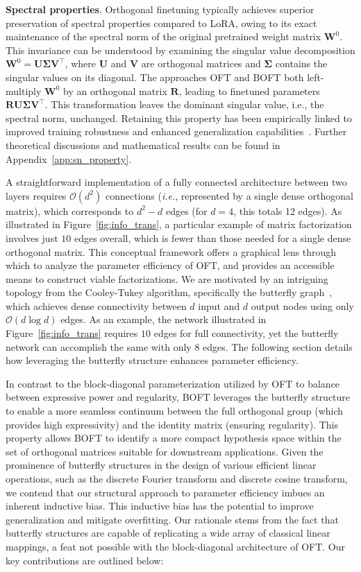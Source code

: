 \textbf{Spectral properties}. Orthogonal finetuning typically achieves superior preservation of spectral properties compared to LoRA, owing to its exact maintenance of the spectral norm of the original pretrained weight matrix $\bm{W}^0$. This invariance can be understood by examining the singular value decomposition $\bm{W}^0=\bm{U}\bm{\Sigma}\bm{V}^\top$, where $\bm{U}$ and $\bm{V}$ are orthogonal matrices and $\bm{\Sigma}$ contains the singular values on its diagonal. The approaches OFT and BOFT both left-multiply $\bm{W}^0$ by an orthogonal matrix $\bm{R}$, leading to finetuned parameters $\bm{R}\bm{U}\bm{\Sigma}\bm{V}^\top$. This transformation leaves the dominant singular value, i.e., the spectral norm, unchanged. Retaining this property has been empirically linked to improved training robustness and enhanced generalization capabilities~\cite{miyato2018spectral,yoshida2017spectral}. Further theoretical discussions and mathematical results can be found in Appendix~\ref{app:sn_property}.

A straightforward implementation of a fully connected architecture between two layers requires $\mathcal{O}(d^2)$ connections (\emph{i.e.}, represented by a single dense orthogonal matrix), which corresponds to $d^2 - d$ edges (for $d=4$, this totals 12 edges). As illustrated in Figure~\ref{fig:info_trans}, a particular example of matrix factorization involves just $10$ edges overall, which is fewer than those needed for a single dense orthogonal matrix. This conceptual framework offers a graphical lens through which to analyze the parameter efficiency of OFT, and provides an accessible means to construct viable factorizations. We are motivated by an intriguing topology from the Cooley-Tukey algorithm, specifically the butterfly graph~\cite{cooley1965algorithm}, which achieves dense connectivity between $d$ input and $d$ output nodes using only $\mathcal{O}(d\log d)$ edges. As an example, the network illustrated in Figure~\ref{fig:info_trans} requires $10$ edges for full connectivity, yet the butterfly network can accomplish the same with only $8$ edges. The following section details how leveraging the butterfly structure enhances parameter efficiency.

In contrast to the block-diagonal parameterization utilized by OFT to balance between expressive power and regularity, BOFT leverages the butterfly structure to enable a more seamless continuum between the full orthogonal group (which provides high expressivity) and the identity matrix (ensuring regularity). This property allows BOFT to identify a more compact hypothesis space within the set of orthogonal matrices suitable for downstream applications. Given the prominence of butterfly structures in the design of various efficient linear operations, such as the discrete Fourier transform and discrete cosine transform, we contend that our structural approach to parameter efficiency imbues an inherent inductive bias. This inductive bias has the potential to improve generalization and mitigate overfitting. Our rationale stems from the fact that butterfly structures are capable of replicating a wide array of classical linear mappings, a feat not possible with the block-diagonal architecture of OFT. Our key contributions are outlined below:

